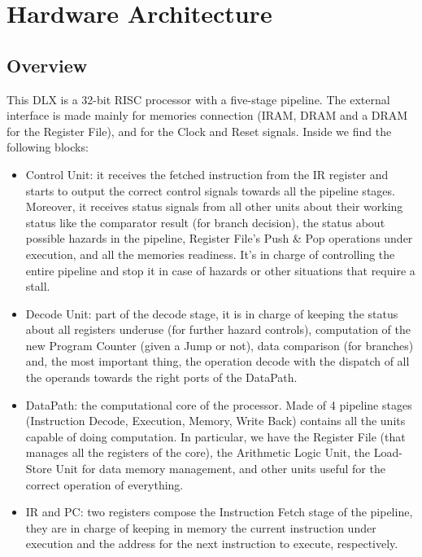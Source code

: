 \chapter{Hardware Architecture}

\section{Overview}

This DLX is a 32-bit RISC processor with a five-stage pipeline. The external interface is made mainly for memories connection (IRAM, DRAM and a DRAM for the Register File), and for the Clock and Reset signals. Inside we find the following blocks:

\begin{itemize}
    \item Control Unit: it receives the fetched instruction from the IR register and starts to output the correct control signals towards all the pipeline stages. Moreover, it receives status signals from all other units about their working status like the comparator result (for branch decision), the status about possible hazards in the pipeline, Register File's Push \& Pop operations under execution, and all the memories readiness. It's in charge of controlling the entire pipeline and stop it in case of hazards or other situations that require a stall.
    \item Decode Unit: part of the decode stage, it is in charge of keeping the status about all registers underuse (for further hazard controls), computation of the new Program Counter (given a Jump or not), data comparison (for branches) and, the most important thing, the operation decode with the dispatch of all the operands towards the right ports of the DataPath.
    \item DataPath: the computational core of the processor. Made of 4 pipeline stages (Instruction Decode, Execution, Memory, Write Back) contains all the units capable of doing computation. In particular, we have the Register File (that manages all the registers of the core), the Arithmetic Logic Unit, the Load-Store Unit for data memory management, and other units useful for the correct operation of everything.
    \item IR and PC: two registers compose the Instruction Fetch stage of the pipeline, they are in charge of keeping in memory the current instruction under execution and the address for the next instruction to execute, respectively. 
\end{itemize}


